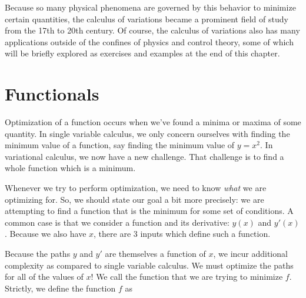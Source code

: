 Because so many physical phenomena are governed by this behavior to minimize certain quantities, the calculus of variations became a prominent field of study from the 17th to 20th century. Of course, the calculus of variations also has many applications outside of the confines of physics and control theory, some of which will be briefly explored as exercises and examples at the end of this chapter.

\section{Functionals}

Optimization of a function occurs when we've found a minima or maxima of some quantity. In single variable calculus, we only concern ourselves with finding the minimum value of a function, say finding the minimum value of $y=x^2$. In variational calculus, we now have a new challenge. That challenge is to find a whole function which is a minimum.

Whenever we try to perform optimization, we need to know \textit{what} we are optimizing for. So, we should state our goal a bit more precisely: we are attempting to find a function that is the minimum for some set of conditions. A common case is that we consider a function and its derivative: $y(x)$ and $y'(x)$. Because we also have $x$, there are 3 inputs which define such a function.

Because the paths $y$ and $y'$ are themselves a function of $x$, we incur additional complexity as compared to single variable calculus. We must optimize the paths for all of the values of $x$! We call the function that we are trying to minimize $f$. Strictly, we define the function $f$ as

